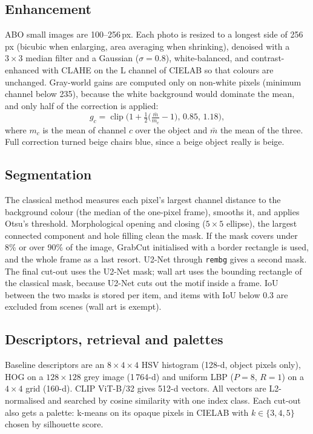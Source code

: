 \documentclass[conference]{IEEEtran}
\begin{document}
\subsection{Enhancement}
ABO small images are 100--256\,px. Each photo is resized to a longest side of 256\,px (bicubic when enlarging, area averaging when shrinking), denoised with a $3{\times}3$ median filter and a Gaussian ($\sigma{=}0.8$), white-balanced, and contrast-enhanced with CLAHE on the L channel of CIELAB so that colours are unchanged. Gray-world gains are computed only on non-white pixels (minimum channel below 235), because the white background would dominate the mean, and only half of the correction is applied:
\begin{equation}
g_c=\operatorname{clip}\!\Big(1+\tfrac12\big(\tfrac{\bar m}{m_c}-1\big),\,0.85,\,1.18\Big),
\end{equation}
where $m_c$ is the mean of channel $c$ over the object and $\bar m$ the mean of the three. Full correction turned beige chairs blue, since a beige object really is beige.

\subsection{Segmentation}
The classical method measures each pixel's largest channel distance to the background colour (the median of the one-pixel frame), smooths it, and applies Otsu's threshold. Morphological opening and closing ($5{\times}5$ ellipse), the largest connected component and hole filling clean the mask. If the mask covers under 8\% or over 90\% of the image, GrabCut initialised with a border rectangle is used, and the whole frame as a last resort. U2-Net through \texttt{rembg} gives a second mask. The final cut-out uses the U2-Net mask; wall art uses the bounding rectangle of the classical mask, because U2-Net cuts out the motif inside a frame. IoU between the two masks is stored per item, and items with IoU below 0.3 are excluded from scenes (wall art is exempt).

\subsection{Descriptors, retrieval and palettes}
Baseline descriptors are an $8{\times}4{\times}4$ HSV histogram (128-d, object pixels only), HOG on a $128{\times}128$ grey image (1\,764-d) and uniform LBP ($P{=}8$, $R{=}1$) on a $4{\times}4$ grid (160-d). CLIP ViT-B/32 gives 512-d vectors. All vectors are L2-normalised and searched by cosine similarity with one index class. Each cut-out also gets a palette: k-means on its opaque pixels in CIELAB with $k\in\{3,4,5\}$ chosen by silhouette score.
\end{document}
